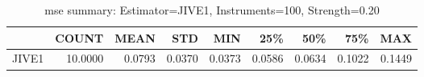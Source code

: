 \begin{table}[ht]
\centering
\caption{mse summary: Estimator=JIVE1, Instruments=100, Strength=0.20}
\begin{tabular}{lrrrrrrrr}
\toprule
 & COUNT & MEAN & STD & MIN & 25\% & 50\% & 75\% & MAX \\
\midrule
JIVE1 & 10.0000 & 0.0793 & 0.0370 & 0.0373 & 0.0586 & 0.0634 & 0.1022 & 0.1449 \\
\bottomrule
\end{tabular}
\end{table}

